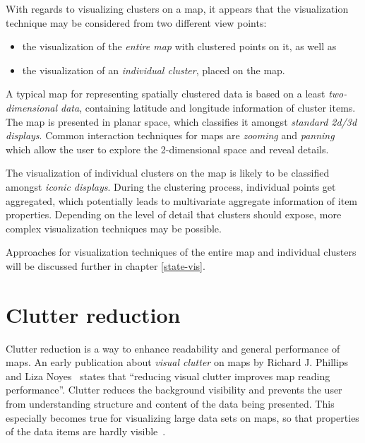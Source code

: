 With regards to visualizing clusters on a map, it appears that the visualization technique may be considered from two different view points:

\begin{itemize}

\item the visualization of the \textit{entire map} with clustered points on it, as well as

\item the visualization of an \textit{individual cluster}, placed on the map.

\end{itemize}

A typical map for representing spatially clustered data is based on a least \textit{two-dimensional data}, containing latitude and longitude information of cluster items. The map is presented in planar space, which classifies it amongst \textit{standard 2d/3d displays}. Common interaction techniques for maps are \textit{zooming} and \textit{panning} which allow the user to explore the 2-dimensional space and reveal details.

The visualization of individual clusters on the map is likely to be classified amongst \textit{iconic displays}. During the clustering process, individual points get aggregated, which potentially leads to multivariate aggregate information of item properties. Depending on the level of detail that clusters should expose, more complex visualization techniques may be possible. 

Approaches for visualization techniques of the entire map and individual clusters will be discussed further in chapter  \ref{state-vis}.

\section{Clutter reduction}
\label{clutter-reduction}

Clutter reduction is a way to enhance readability and general performance of maps. An early publication about \textit{visual clutter} on maps by Richard J. Phillips and Liza Noyes~\cite{phillips82clutter} states that ``reducing visual clutter improves map reading performance''. Clutter reduces the background visibility and prevents the user from understanding structure and content of the data being presented. This especially becomes true for visualizing large data sets on maps, so that properties of the data items are hardly visible~\cite{harvey2008primer, Delort10vis}.

